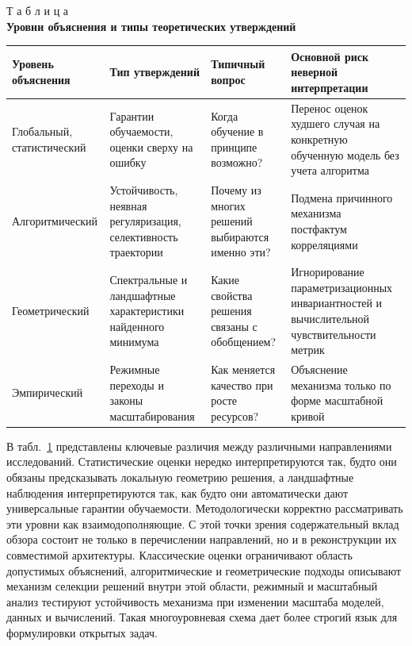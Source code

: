 \begin{table}[htbp]
\label{tab:explanation_levels}
\begin{flushright}
{Т а б л и ц а \thetable}\\
\centering
\textbf{Уровни объяснения и типы теоретических утверждений}
\end{flushright}
\centering
\scriptsize
\setlength{\tabcolsep}{3pt}
\begin{tabular}{|>{\raggedright\arraybackslash}m{1.05in}|>{\raggedright\arraybackslash}m{1.15in}|>{\raggedright\arraybackslash}m{1.25in}|>{\raggedright\arraybackslash}m{1.55in}|}
\hline
Уровень объяснения & Тип утверждений & Типичный вопрос & Основной риск неверной интерпретации \\
\hline
Глобальный, статистический & Гарантии обучаемости, оценки сверху на ошибку & Когда обучение в принципе возможно? & Перенос оценок худшего случая на конкретную обученную модель без учета алгоритма \\
\hline
Алгоритмический & Устойчивость, неявная регуляризация, селективность траектории & Почему из многих решений выбираются именно эти? & Подмена причинного механизма постфактум корреляциями \\
\hline
Геометрический & Спектральные и ландшафтные характеристики найденного минимума & Какие свойства решения связаны с обобщением? & Игнорирование параметризационных инвариантностей и вычислительной чувствительности метрик \\
\hline
Эмпирический & Режимные переходы и законы масштабирования & Как меняется качество при росте ресурсов? & Объяснение механизма только по форме масштабной кривой \\
\hline
\end{tabular}
\end{table}

В табл.~\ref{tab:explanation_levels} представлены ключевые различия между различными направлениями исследований.
Статистические оценки нередко интерпретируются так, будто они обязаны предсказывать локальную геометрию решения, а ландшафтные наблюдения интерпретируются так, как будто они автоматически дают универсальные гарантии обучаемости.
Методологически корректно рассматривать эти уровни как взаимодополняющие.
С этой точки зрения содержательный вклад обзора состоит не только в перечислении направлений, но и в реконструкции их совместимой архитектуры.
Классические оценки ограничивают область допустимых объяснений, алгоритмические и геометрические подходы описывают механизм селекции решений внутри этой области, режимный и масштабный анализ тестируют устойчивость механизма при изменении масштаба моделей, данных и вычислений.
Такая многоуровневая схема дает более строгий язык для формулировки открытых задач.

